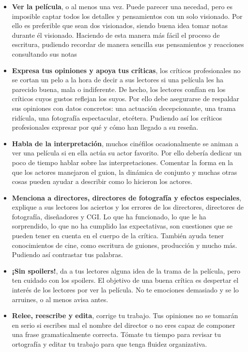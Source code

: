 \begin{itemize}
\item \textbf{Ver la película}, o al menos una vez. Puede parecer una necedad, pero es imposible captar todos los detalles y pensamientos con un solo visionado. Por ello es preferible que sean dos visionados, siendo buena idea tomar notas durante él visionado. Haciendo de esta manera más fácil el proceso de escritura, pudiendo recordar de manera sencilla sus pensamientos y reacciones consultando sus notas 
\item \textbf{Expresa tus opiniones y apoya tus críticas}, los críticos profesionales no se cortan un pelo a la hora de decir a sus lectores si una película les ha parecido buena, mala o indiferente. De hecho, los lectores confían en los críticos cuyos gustos reflejan los suyos. Por ello debe asegurarse de respaldar sus opiniones con datos concretos: una actuación decepcionante, una trama ridícula, una fotografía espectacular, etcétera. Pudiendo así los críticos profesionales expresar por qué y cómo han llegado a su reseña.
\item \textbf{Habla de la interpretación}, muchos cinéfilos ocasionalmente se animan a ver una película si en ella actúa su actor favorito. Por ello debería dedicar un poco de tiempo hablar sobre las interpretaciones. Comentar la forma en la que los actores manejaron el guion, la dinámica de conjunto y muchas otras cosas pueden ayudar a describir como lo hicieron los actores.
\item \textbf{Menciona a directores, directores de fotografía y efectos especiales}, explique a sus lectores los aciertos y los errores de los directores, directores de fotografía, diseñadores y CGI. Lo que ha funcionado, lo que le ha sorprendido, lo que no ha cumplido las expectativas, son cuestiones que se pueden tener en cuenta en el cuerpo de la crítica. También ayuda tener conocimientos de cine, como escritura de guiones, producción y mucho más. Pudiendo así contrastar tus palabras.
\item \textbf{¡Sin spoilers!}, da a tus lectores alguna idea de la trama de la película, pero ten cuidado con los spoilers. El objetivo de una buena crítica es despertar el interés de los lectores por ver la película. No te emociones demasiado y se lo arruines, o al menos avisa antes.
\item \textbf{Relee, reescribe y edita}, corrige tu trabajo. Tus opiniones no se tomarán en serio si escribes mal el nombre del director o no eres capaz de componer una frase gramaticalmente correcta. Tómate tu tiempo para revisar tu ortografía y editar tu trabajo para que tenga fluidez organizativa.
\end{itemize}


